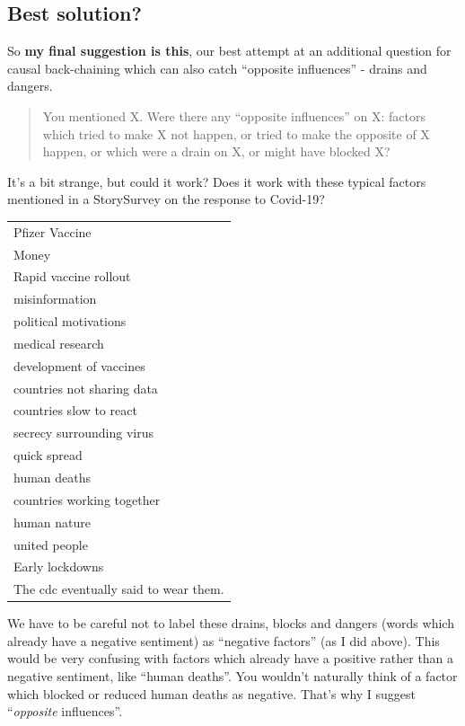 \documentclass[
]{book}
\begin{document}
\hypertarget{best-solution}{%
\subsection{Best solution?}\label{best-solution}}

So \textbf{my final suggestion is this}, our best attempt at an additional question for causal back-chaining which can also catch ``opposite influences'' - drains and dangers.

\begin{quote}
You mentioned X. Were there any ``opposite influences'' on X: factors which tried to make X not happen, or tried to make the opposite of X happen, or which were a drain on X, or might have blocked X?
\end{quote}

It's a bit strange, but could it work? Does it work with these typical factors mentioned in a StorySurvey on the response to Covid-19?

\begin{longtable}[]{@{}l@{}}
\toprule()
\endhead
Pfizer Vaccine \\
Money \\
Rapid vaccine rollout \\
misinformation \\
political motivations \\
medical research \\
development of vaccines \\
countries not sharing data \\
countries slow to react \\
secrecy surrounding virus \\
quick spread \\
human deaths \\
countries working together \\
human nature \\
united people \\
Early lockdowns \\
The cdc eventually said to wear them. \\
\bottomrule()
\end{longtable}

We have to be careful not to label these drains, blocks and dangers (words which already have a negative sentiment) as ``negative factors'' (as I did above). This would be very confusing with factors which already have a positive rather than a negative sentiment, like ``human deaths''. You wouldn't naturally think of a factor which blocked or reduced human deaths as negative. That's why I suggest ``\emph{opposite} influences''.
\end{document}
